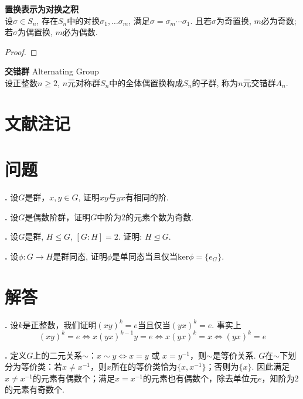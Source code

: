 \begin{pro}\textbf{置换表示为对换之积}\\
设$\sigma\in S_n$, 存在$S_n$中的对换$\sigma_1, \dots\sigma_m$, 满足$\sigma = \sigma_m\cdots\sigma_1$. 且若$\sigma$为奇置换, $m$必为奇数; 若$\sigma$为偶置换, $m$必为偶数.
\end{pro}
\begin{proof}

\end{proof}

\begin{dfn} \textbf{交错群} Alternating Group\\
设正整数$n\ge 2$, $n$元对称群$S_n$中的全体偶置换构成$S_n$的子群, 称为$n$元交错群$A_n$. 
\end{dfn}


\section*{文献注记}

\section*{问题}
\par \textbf{\theprobgrp .} \cite{GS} 设$G$是群，$x,y\in G$, 证明$xy$与$yx$有相同的阶. 

\par \textbf{\theprobgrp .} \cite{GS} 设$G$是偶数阶群，证明$G$中阶为2的元素个数为奇数.

\par \textbf{\theprobgrp .} 设$G$是群, $H\le G$, $[G:H]=2$. 证明: $H\unlhd G$. 

\par \textbf{\theprobgrp .} 设$\phi:G\to H$是群同态, 证明$\phi$是单同态当且仅当$\mathrm{ker}\phi = \{e_G\}$. 

\section*{解答}
\par \textbf{\thesolgrp .} 设$k$是正整数，我们证明$(xy)^k=e$当且仅当$(yx)^k=e$. 事实上
\begin{equation}
    (xy)^k=e \iff x(yx)^{k-1}y=e \iff x(yx)^{k}=x \iff (yx)^{k}=e
\end{equation}

\par \textbf{\thesolgrp .} 定义$G$上的二元关系$\sim$：$x\sim y \iff x=y$ 或 $x=y^{-1}$，则$\sim$是等价关系. $G$在$\sim$下划分为等价类：若$x\neq x^{-1}$，则$x$所在的等价类恰为$\{x,x^{-1}\}$；否则为$\{x\}$. 因此满足$x\neq x^{-1}$的元素有偶数个；满足$x=x^{-1}$的元素也有偶数个，除去单位元$e$，知阶为2的元素有奇数个.

